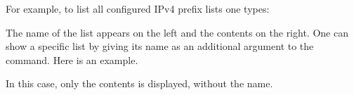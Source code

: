 For example, to list all configured IPv4 prefix lists one types:

\noindent{}

The name of the list appears on the left and the contents on the right.  One can
show a specific list by giving its name as an additional argument to the
command.  Here is an example.

\noindent{}

In this case, only the contents is displayed, without the name.
